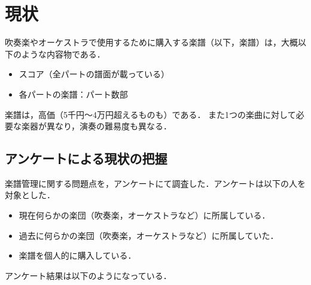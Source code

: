 \chapter{現状}
吹奏楽やオーケストラで使用するために購入する楽譜（以下，楽譜）は，大概以下のような内容物である．
\begin{itemize}
    \item スコア（全パートの譜面が載っている）
    \item 各パートの楽譜：パート数部
\end{itemize}
楽譜は，高価（5千円〜4万円超えるものも）である．
また1つの楽曲に対して必要な楽器が異なり，演奏の難易度も異なる．
\section{アンケートによる現状の把握}\label{chap:issues}
楽譜管理に関する問題点を，アンケートにて調査した．アンケートは以下の人を対象とした．
\begin{itemize}
    \item 現在何らかの楽団（吹奏楽，オーケストラなど）に所属している．
    \item 過去に何らかの楽団（吹奏楽，オーケストラなど）に所属していた．
    \item 楽譜を個人的に購入している．
\end{itemize}
アンケート結果は以下のようになっている．
